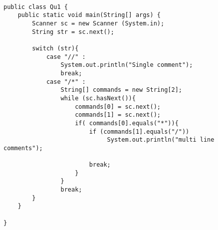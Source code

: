 \begin{center}
\LTR
\begin{lstlisting}

public class Qu1 {
    public static void main(String[] args) {
        Scanner sc = new Scanner (System.in);
        String str = sc.next();

        switch (str){
            case "//" :
                System.out.println("Single comment");
                break;
            case "/*" :
                String[] commands = new String[2];
                while (sc.hasNext()){
                    commands[0] = sc.next();
                    commands[1] = sc.next();
                    if( commands[0].equals("*")){
                        if (commands[1].equals("/"))
                             System.out.println("multi line comments");
                          
                        break;
                    }
                }
                break;
        }
    }
    
}
\end{lstlisting}
\end{center}

\pagebreak
